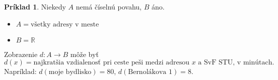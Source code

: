 \documentclass[12pt, a4paper]{article}
\theoremstyle{definition}
\newtheorem{example}[definition]{Príklad}
\theoremstyle{plain}
\theoremstyle{remark}
\begin{document}
\begin{example}
Niekedy $A$ nemá číselnú povahu, $B$ áno.
\begin{itemize}
    \item $A = \text{všetky adresy v meste}$
    \item $B = \mathbb{R}$
\end{itemize}
Zobrazenie $d \colon A \to B$ môže byť \[
d(x) = \text{najkratšia vzdialenosť pri ceste peši medzi adresou $x$ a SvF STU, v minútach}.\]
Napríklad: $d(\text{moje bydlisko}) = 80$, $d(\text{Bernolákova 1})=8$.
\end{example}
\end{document}
